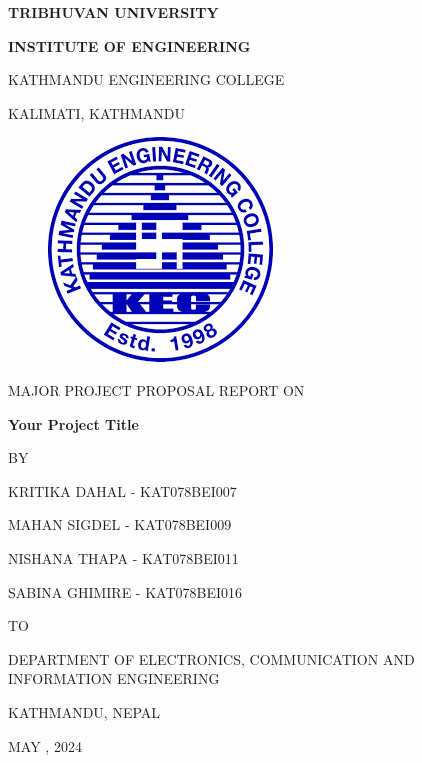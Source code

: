 \begin{titlepage}
    \thispagestyle{empty}
    \begin{center}
    
    \vspace*{\fill} %
    {\large \textbf{TRIBHUVAN UNIVERSITY
}\par}
{\large \textbf{INSTITUTE OF ENGINEERING
}\par}
\vspace{8pt}
KATHMANDU ENGINEERING COLLEGE

KALIMATI, KATHMANDU
\vspace{24pt}

\begin{figure}[ht]
    \centering
    \includegraphics[scale=0.45]{images/kec.png}
\end{figure}
\vspace{24pt}
{MAJOR PROJECT PROPOSAL REPORT ON\par}
\vspace{14pt}
{\textbf{ Your Project Title}\par}

\vspace{14pt}
{BY\par}
\vspace{14pt}

{KRITIKA DAHAL - KAT078BEI007\par}
{MAHAN SIGDEL - KAT078BEI009\par}
{NISHANA THAPA - KAT078BEI011\par}
{SABINA GHIMIRE - KAT078BEI016\par}

\vspace{24pt}
{TO\par}
\vspace{14pt}
{DEPARTMENT OF ELECTRONICS, COMMUNICATION AND INFORMATION ENGINEERING\par}
{KATHMANDU, NEPAL\par}
{MAY , 2024\par}

    \vspace*{\fill}

    \end{center}
\end{titlepage}